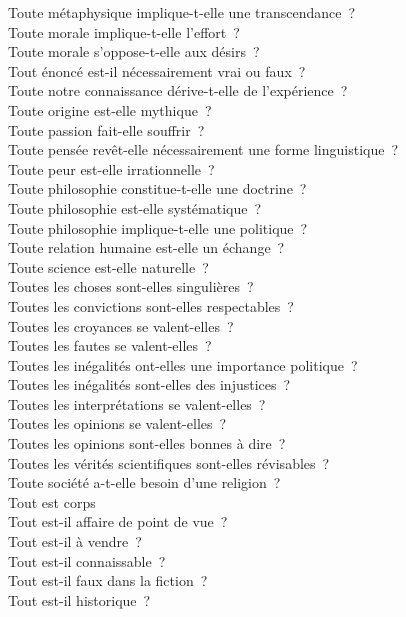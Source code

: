 \documentclass[a4paper,12pt]{article}
\begin{document}
Toute métaphysique implique-t-elle une transcendance ? \\
Toute morale implique-t-elle l'effort ? \\
Toute morale s'oppose-t-elle aux désirs ? \\
Tout énoncé est-il nécessairement vrai ou faux ? \\
Toute notre connaissance dérive-t-elle de l'expérience ? \\
Toute origine est-elle mythique ? \\
Toute passion fait-elle souffrir ? \\
Toute pensée revêt-elle nécessairement une forme linguistique ? \\
Toute peur est-elle irrationnelle ? \\
Toute philosophie constitue-t-elle une doctrine ? \\
Toute philosophie est-elle systématique ? \\
Toute philosophie implique-t-elle une politique ? \\
Toute relation humaine est-elle un échange ? \\
Toute science est-elle naturelle ? \\
Toutes les choses sont-elles singulières ? \\
Toutes les convictions sont-elles respectables ? \\
Toutes les croyances se valent-elles ? \\
Toutes les fautes se valent-elles ? \\
Toutes les inégalités ont-elles une importance politique ? \\
Toutes les inégalités sont-elles des injustices ? \\
Toutes les interprétations se valent-elles ? \\
Toutes les opinions se valent-elles ? \\
Toutes les opinions sont-elles bonnes à dire ? \\
Toutes les vérités  scientifiques sont-elles révisables ? \\
Toute société a-t-elle besoin d'une religion ? \\
Tout est corps \\
Tout est-il affaire de point de vue ? \\
Tout est-il à vendre ? \\
Tout est-il connaissable ? \\
Tout est-il faux dans la fiction ? \\
Tout est-il historique ? \\
\end{document}

